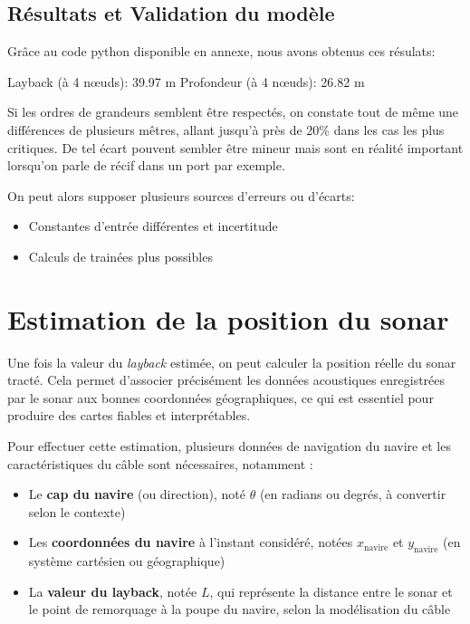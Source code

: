 \documentclass[12pt,a4paper]{report}
\begin{document}
\subsection{Résultats et Validation du modèle}


Grâce au code python disponible en annexe, nous avons obtenus ces résulats:

Layback (à 4 nœuds): 39.97 m
Profondeur (à 4 nœuds): 26.82 m

Si les ordres de grandeurs semblent être respectés, on constate tout de même une différences de plusieurs mêtres,
allant jusqu'à près de 20\% dans les cas les plus critiques.
De tel écart pouvent sembler être mineur mais sont en réalité important lorsqu'on parle de récif dans un port par exemple.

On peut alors supposer plusieurs sources d'erreurs ou d'écarts:
\begin{itemize}
  \item Constantes d'entrée différentes et incertitude
  \item Calculs de trainées plus possibles
\end{itemize}


\section{Estimation de la position du sonar}

Une fois la valeur du \textit{layback} estimée, on peut calculer la position réelle du sonar tracté. Cela permet d’associer précisément les données acoustiques enregistrées par le sonar aux bonnes coordonnées géographiques, ce qui est essentiel pour produire des cartes fiables et interprétables.

Pour effectuer cette estimation, plusieurs données de navigation du navire et les caractéristiques du câble sont nécessaires, notamment :

\begin{itemize}
  \item Le \textbf{cap du navire} (ou direction), noté $\theta$ (en radians ou degrés, à convertir selon le contexte)
  \item Les \textbf{coordonnées du navire} à l’instant considéré, notées $x_{\text{navire}}$ et $y_{\text{navire}}$ (en système cartésien ou géographique)
  \item La \textbf{valeur du layback}, notée $L$, qui représente la distance entre le sonar et le point de remorquage à la poupe du navire, selon la modélisation du câble
\end{itemize}
\end{document}
